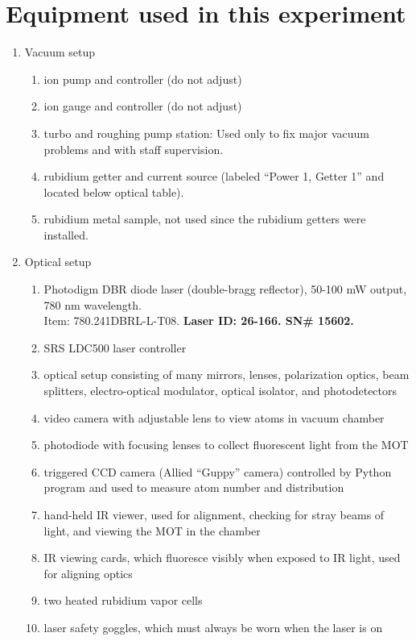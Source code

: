 \documentclass{../lab}
\begin{document}
\section{Equipment used in this experiment}

\begin{enumerate}
    \item Vacuum setup 
    \begin{enumerate}
        \item ion pump and controller (do not adjust)
        \item ion gauge and controller (do not adjust)
        \item turbo and roughing pump station: Used only to fix major vacuum problems and with staff supervision.
        \item rubidium getter and current source (labeled ``Power 1, Getter 1'' and located below optical table).
        \item rubidium metal sample, not used since the rubidium getters were installed.
    \end{enumerate}
    
    \item Optical setup
    \begin{enumerate}
        \item Photodigm DBR diode laser (double-bragg reflector), 50-100 mW output, 780 nm wavelength. \\
        Item: 780.241DBRL-L-T08. \textbf{Laser ID: 26-166. SN\# 15602.}
        \item SRS LDC500 laser controller
        \item optical setup consisting of many mirrors, lenses, polarization optics, beam splitters, electro-optical modulator, optical isolator, and photodetectors
        \item video camera with adjustable lens to view atoms in vacuum chamber
        \item photodiode with focusing lenses to collect fluorescent light from the MOT
        \item triggered CCD camera (Allied ``Guppy'' camera) controlled by Python program and used to measure atom number and distribution
        \item hand-held IR viewer, used for alignment, checking for stray beams of light, and viewing the MOT in the chamber
        \item IR viewing cards, which fluoresce visibly when exposed to IR light, used for aligning optics
        \item two heated rubidium vapor cells
        \item laser safety goggles, which must always be worn when the laser is on
    \end{enumerate}


\end{enumerate}
\end{document}
